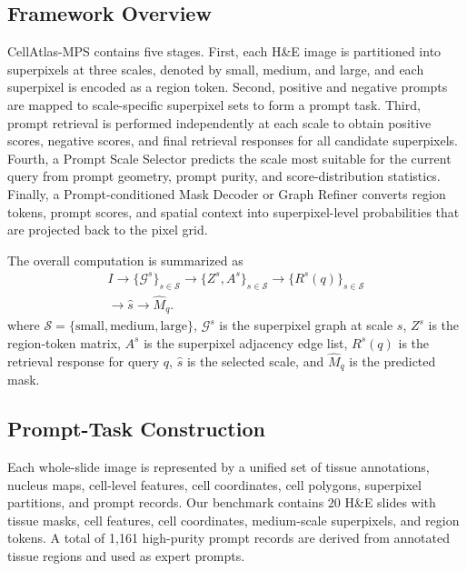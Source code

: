 \documentclass[letterpaper]{article} %
\begin{document}
\subsection{Framework Overview}

CellAtlas-MPS contains five stages. First, each H\&E image is partitioned into superpixels at three scales, denoted by small, medium, and large, and each superpixel is encoded as a region token. Second, positive and negative prompts are mapped to scale-specific superpixel sets to form a prompt task. Third, prompt retrieval is performed independently at each scale to obtain positive scores, negative scores, and final retrieval responses for all candidate superpixels. Fourth, a Prompt Scale Selector predicts the scale most suitable for the current query from prompt geometry, prompt purity, and score-distribution statistics. Finally, a Prompt-conditioned Mask Decoder or Graph Refiner converts region tokens, prompt scores, and spatial context into superpixel-level probabilities that are projected back to the pixel grid.

The overall computation is summarized as
\begin{equation}
\begin{aligned}
    I \rightarrow \{\mathcal{G}^{s}\}_{s \in \mathcal{S}}
    \rightarrow \{Z^{s}, A^{s}\}_{s \in \mathcal{S}}
    \rightarrow \{R^{s}(q)\}_{s \in \mathcal{S}}\\
    \rightarrow \hat{s}
    \rightarrow \hat{M}_{q}.
\end{aligned}
\end{equation}
where $\mathcal{S}=\{\mathrm{small},\mathrm{medium},\mathrm{large}\}$, $\mathcal{G}^{s}$ is the superpixel graph at scale $s$, $Z^{s}$ is the region-token matrix, $A^{s}$ is the superpixel adjacency edge list, $R^{s}(q)$ is the retrieval response for query $q$, $\hat{s}$ is the selected scale, and $\hat{M}_{q}$ is the predicted mask.

\subsection{Prompt-Task Construction}

Each whole-slide image is represented by a unified set of tissue annotations, nucleus maps, cell-level features, cell coordinates, cell polygons, superpixel partitions, and prompt records. Our benchmark contains 20 H\&E slides with tissue masks, cell features, cell coordinates, medium-scale superpixels, and region tokens. A total of 1,161 high-purity prompt records are derived from annotated tissue regions and used as expert prompts.
\end{document}
